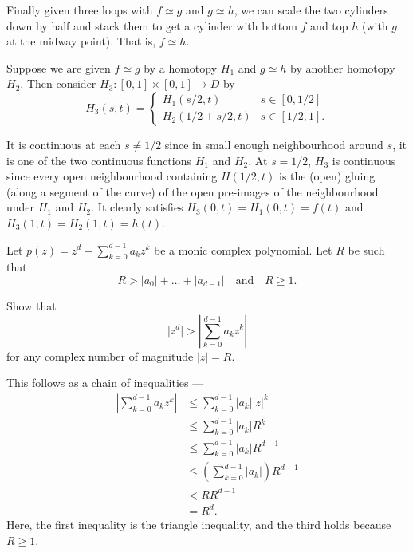 \documentclass[12 pt, letterpaper]{hmcpset}
\begin{document}
\begin{solution}
	Finally given three loops with $f \simeq g$ and $g \simeq h$, we can scale the two cylinders down by half and stack them to get a cylinder with bottom $f$ and top $h$ (with $g$ at the midway point). That is, $f \simeq h$.

	Suppose we are given $f \simeq g$ by a homotopy $H_{1}$ and $g \simeq h$ by another homotopy $H_{2}$. Then consider $H_{3} : [0, 1] \times [0, 1] \to D$ by
	\[
		H_{3}(s, t) = \begin{cases}
			H_{1}(s/2, t) & s \in [0, 1/2] \\
			H_{2}(1/2 + s/2, t) & s \in [1/2, 1].
		\end{cases}
	\]

	It is continuous at each $s \neq 1/2$ since in small enough neighbourhood around $s$, it is one of the two continuous functions $H_{1}$ and $H_{2}$. At $s = 1/2$, $H_{3}$ is continuous since every open neighbourhood containing $H(1/2, t)$ is the (open) gluing (along a segment of the curve) of the open pre-images of the neighbourhood under $H_{1}$ and $H_{2}$. It clearly satisfies $H_{3}(0, t) = H_{1}(0, t) = f(t)$ and $H_{3}(1, t) = H_{2}(1, t) = h(t)$.
\end{solution}

\pagebreak

\begin{problem}[11.]
	Let $p(z) = z^{d} + \sum_{k = 0}^{d - 1} a_{k} z^{k}$ be a monic complex polynomial. Let $R$ be such that
	\[
		R > \lvert a_0 \rvert + \dots + \lvert a_{d-1} \rvert \quad \text{and} \quad R \ge 1.
	\]

	Show that
	\[
		\lvert z^{d} \rvert > \left \lvert \sum_{k = 0}^{d - 1} a_{k} z^{k} \right \rvert
	\]
	for any complex number of magnitude $\lvert z \rvert = R$.
\end{problem}

\begin{solution}
	This follows as a chain of inequalities ---
	\begin{align*}
		\left \lvert \sum_{k = 0}^{d - 1} a_{k} z^{k} \right \rvert & \le \sum_{k = 0}^{d - 1} \lvert a_{k} \rvert \lvert z \rvert^{k} \\
									& \le \sum_{k = 0}^{d - 1} \lvert a_{k} \rvert R^{k} \\
									& \le \sum_{k = 0}^{d - 1} \lvert a_{k} \rvert R^{d - 1} \\
									& \le \left ( \sum_{k = 0}^{d - 1} \lvert a_{k} \rvert \right )  R^{d - 1} \\
									& < R R^{d - 1} \\
									& = R^{d}.
	\end{align*}
	Here, the first inequality is the triangle inequality, and the third holds because $R \ge 1$.
\end{solution}
\end{document}

